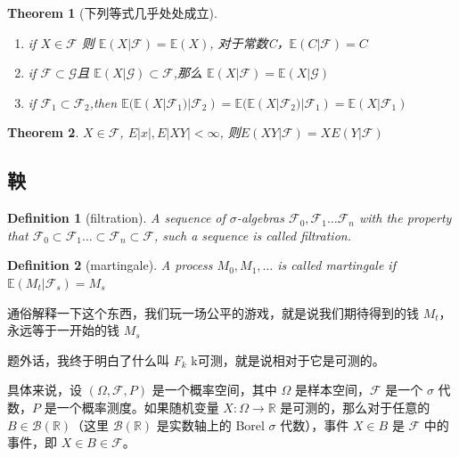 \documentclass{article}
\newtheorem{theorem}{Theorem}
\newtheorem{definition}{Definition}
\begin{document}
\begin{theorem}[下列等式几乎处处成立]
     
    \begin{enumerate}
        \item  if $X \in \mathcal{F}$ 则 $ \mathbb{E}(X|\mathcal{F})=\mathbb{E}(X) $, 对于常数C，$ \mathbb{E}(C|\mathcal{F})=C $
        \item if $ \mathcal{F}\subset \mathcal{G} $且 $ \mathbb{E}(X|\mathcal{G})\subset \mathcal{F} $,那么 $ \mathbb{E}(X|\mathcal{F})=\mathbb{E}(X|\mathcal{G}) $
        \item if $ \mathcal{F}_1 \subset \mathcal{F}_2 $,then $ \mathbb{E}(\mathbb{E}(X|\mathcal{F}_1)|\mathcal{F}_2) =\mathbb{E}(\mathbb{E}(X|\mathcal{F}_2)|\mathcal{F}_1)= \mathbb{E}(X|\mathcal{F}_1)$
    \end{enumerate}
\end{theorem}
\begin{theorem}
    $ X \in \mathcal{F} $, $ E|x|,E|XY| < \infty  $, 则$ E(XY|\mathcal{F})=XE(Y|\mathcal{F}) $
\end{theorem}




\newpage



\subsection{鞅}

\begin{definition}[filtration]
    A sequence of $ \sigma$-algebras $ \mathcal{F}_0, \mathcal{F}_1 \dots \mathcal{F}_n  $ with the property that $  \mathcal{F}_0\subset  \mathcal{F}_1 \dots \subset \mathcal{F}_n \subset \mathcal{F} $, such a sequence is called filtration.
\end{definition}

\begin{definition}[martingale]
   A process $ M_0,M_1,\dots $ is called martingale if  $ \mathbb{E}(M_{t}|\mathcal{F}_s)=M_s $
\end{definition}

通俗解释一下这个东西，我们玩一场公平的游戏，就是说我们期待得到的钱 $ M_t $，永远等于一开始的钱 $ M_s$

\par
题外话，我终于明白了什么叫 $ F_k $ k可测，就是说相对于它是可测的。\par
具体来说，设 $(\Omega, \mathcal{F}, P)$ 是一个概率空间，其中 $\Omega$ 是样本空间，$\mathcal{F}$ 是一个 $\sigma$ 代数，$P$ 是一个概率测度。如果随机变量 $X: \Omega \rightarrow \mathbb{R}$ 是可测的，那么对于任意的 $B \in \mathcal{B}(\mathbb{R})$（这里 $\mathcal{B}(\mathbb{R})$ 是实数轴上的 Borel $\sigma$ 代数），事件 ${X \in B}$ 是 $\mathcal{F}$ 中的事件，即 ${X \in B} \in \mathcal{F}$。
\end{document}
